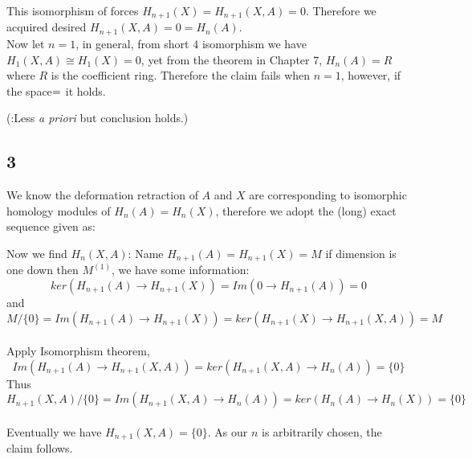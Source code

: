\documentclass[11pt]{article}
\theoremstyle{remark}
\begin{document}
This isomorphism of forces $H_{n+1}(X)= H_{n+1}(X,A)=0$. Therefore we acquired desired $ H_{n+1}(X,A)=0=H_{n}(A)$. \\

Now let $n=1$, in general, from short $4$ isomorphism we have $ H_{1}(X,A)\cong H_1(X) =0$, yet from the theorem in Chapter 7, $H_{n}(A)=R$ where $R$ is the coefficient ring. Therefore the claim fails when $n=1$, however, if the space$=\empty$ it holds.  

(:Less \textit{a priori} but conclusion holds.)


\subsection*{3}
We know the deformation retraction of $A$ and $X$ are corresponding to isomorphic homology modules of $H_{n}(A)=H_{n}(X)$, therefore we adopt the (long) exact sequence given as:

\begin{center}
\end{center}

Now we find $H_{n}(X,A)$: Name $H_{n+1}(A)=H_{n+1}(X)=M$ if dimension is one down then $M^{(1)}$, we have some information: $$ker(H_{n+1}(A)\rightarrow H_{n+1}(X))=Im(0\rightarrow H_{n+1}(A))=0 $$ and $$M/\{0\}=Im(H_{n+1}(A)\rightarrow H_{n+1}(X))=ker(H_{n+1}(X)\rightarrow H_{n+1}(X,A))=M $$ \\

Apply Isomorphism theorem, $$Im(H_{n+1}(A)\rightarrow H_{n+1}(X,A))=ker(H_{n+1}(X,A)\rightarrow H_{n}(A))=\{0\}$$
Thus $$H_{n+1}(X,A)/\{0\}=Im(H_{n+1}(X,A)\rightarrow H_{n}(A))=ker(H_{n}(A)\rightarrow H_{n}(X))=\{0\}$$ \\

Eventually we have $H_{n+1}(X,A)=\{0\}$. As our $n$ is arbitrarily chosen, the claim follows. 
 
 
\end{document}
